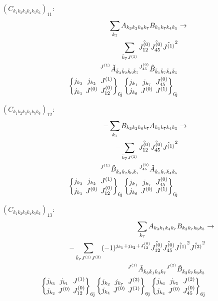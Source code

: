 \documentclass[11pt]{article}
\newcommand{\sixj}[6]{\begingroup\setlength{\arraycolsep}{0.2em}\begin{Bmatrix} #1 & #2 & #3 \\ #4 & #5 & #6 \end{Bmatrix}_{\text{6j}}\endgroup}
\begin{document}
$\left({C}_{{k}_{1}{k}_{2}{k}_{3}{k}_{4}{k}_{5}{k}_{6}}\right)_{11}$:
\begin{align}
\sum_{{k}_{7}}{A}_{{k}_{3}{k}_{2}{k}_{6}{k}_{7}}{B}_{{k}_{1}{k}_{7}{k}_{4}{k}_{5}}&\rightarrow \notag \\\sum_{\tilde{k}_{7}J^{(1)}}\hat{J^{(0)}_{12}}\hat{J^{(0)}_{45}}\hat{J^{(1)}}^{2}& \notag \\{}^{J^{(1)}}\tilde{A}_{\tilde{k}_{3}\tilde{k}_{2}\tilde{k}_{6}\tilde{k}_{7}}{}^{J^{(0)}_{45}}\tilde{B}_{\tilde{k}_{1}\tilde{k}_{7}\tilde{k}_{4}\tilde{k}_{5}}& \notag \\\sixj{j_{{k}_{3}}}{j_{{k}_{2}}}{J^{(1)}}{j_{{k}_{1}}}{J^{(0)}}{J^{(0)}_{12}}\sixj{j_{{k}_{1}}}{j_{{k}_{7}}}{J^{(0)}_{45}}{j_{{k}_{6}}}{J^{(0)}}{J^{(1)}}
\end{align}

$\left({C}_{{k}_{1}{k}_{2}{k}_{3}{k}_{4}{k}_{5}{k}_{6}}\right)_{12}$:
\begin{align}
-\sum_{{k}_{7}}{B}_{{k}_{3}{k}_{2}{k}_{6}{k}_{7}}{A}_{{k}_{1}{k}_{7}{k}_{4}{k}_{5}}&\rightarrow \notag \\-\sum_{\tilde{k}_{7}J^{(1)}}\hat{J^{(0)}_{12}}\hat{J^{(0)}_{45}}\hat{J^{(1)}}^{2}& \notag \\{}^{J^{(1)}}\tilde{B}_{\tilde{k}_{3}\tilde{k}_{2}\tilde{k}_{6}\tilde{k}_{7}}{}^{J^{(0)}_{45}}\tilde{A}_{\tilde{k}_{1}\tilde{k}_{7}\tilde{k}_{4}\tilde{k}_{5}}& \notag \\\sixj{j_{{k}_{3}}}{j_{{k}_{2}}}{J^{(1)}}{j_{{k}_{1}}}{J^{(0)}}{J^{(0)}_{12}}\sixj{j_{{k}_{1}}}{j_{{k}_{7}}}{J^{(0)}_{45}}{j_{{k}_{6}}}{J^{(0)}}{J^{(1)}}
\end{align}

$\left({C}_{{k}_{1}{k}_{2}{k}_{3}{k}_{4}{k}_{5}{k}_{6}}\right)_{13}$:
\begin{align}
\sum_{{k}_{7}}{A}_{{k}_{3}{k}_{1}{k}_{4}{k}_{7}}{B}_{{k}_{2}{k}_{7}{k}_{6}{k}_{5}}&\rightarrow \notag \\-\sum_{\tilde{k}_{7}J^{(1)}J^{(2)}}(-1)^{j_{{k}_{1}} +j_{{k}_{2}} +J^{(0)}_{12} }\hat{J^{(0)}_{12}}\hat{J^{(0)}_{45}}\hat{J^{(1)}}^{2}\hat{J^{(2)}}^{2}& \notag \\{}^{J^{(1)}}\tilde{A}_{\tilde{k}_{3}\tilde{k}_{1}\tilde{k}_{4}\tilde{k}_{7}}{}^{J^{(2)}}\tilde{B}_{\tilde{k}_{2}\tilde{k}_{7}\tilde{k}_{6}\tilde{k}_{5}}& \notag \\\sixj{j_{{k}_{3}}}{j_{{k}_{1}}}{J^{(1)}}{j_{{k}_{2}}}{J^{(0)}}{J^{(0)}_{12}}\sixj{j_{{k}_{2}}}{j_{{k}_{7}}}{J^{(2)}}{j_{{k}_{4}}}{J^{(0)}}{J^{(1)}}\sixj{j_{{k}_{6}}}{j_{{k}_{5}}}{J^{(2)}}{j_{{k}_{4}}}{J^{(0)}}{J^{(0)}_{45}}
\end{align}
\end{document}
